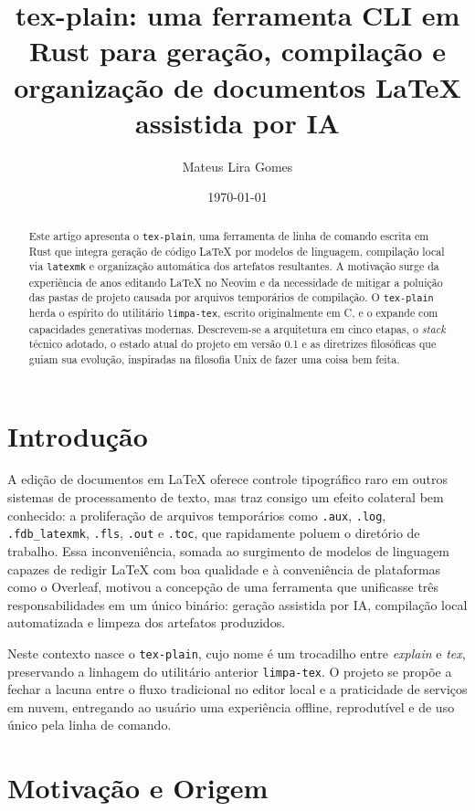 \documentclass[11pt,a4paper]{article}
\title{tex-plain: uma ferramenta CLI em Rust para geração, compilação e organização de documentos LaTeX assistida por IA}
\author{Mateus Lira Gomes}
\date{\today}
\begin{document}
\maketitle

\begin{abstract}
Este artigo apresenta o \texttt{tex-plain}, uma ferramenta de linha de comando escrita em Rust que integra geração de código LaTeX por modelos de linguagem, compilação local via \texttt{latexmk} e organização automática dos artefatos resultantes. A motivação surge da experiência de anos editando LaTeX no Neovim e da necessidade de mitigar a poluição das pastas de projeto causada por arquivos temporários de compilação. O \texttt{tex-plain} herda o espírito do utilitário \texttt{limpa-tex}, escrito originalmente em C, e o expande com capacidades generativas modernas. Descrevem-se a arquitetura em cinco etapas, o \textit{stack} técnico adotado, o estado atual do projeto em versão 0.1 e as diretrizes filosóficas que guiam sua evolução, inspiradas na filosofia Unix de fazer uma coisa bem feita.
\end{abstract}

\section{Introdução}

A edição de documentos em LaTeX oferece controle tipográfico raro em outros sistemas de processamento de texto, mas traz consigo um efeito colateral bem conhecido: a proliferação de arquivos temporários como \texttt{.aux}, \texttt{.log}, \texttt{.fdb\_latexmk}, \texttt{.fls}, \texttt{.out} e \texttt{.toc}, que rapidamente poluem o diretório de trabalho. Essa inconveniência, somada ao surgimento de modelos de linguagem capazes de redigir LaTeX com boa qualidade e à conveniência de plataformas como o Overleaf, motivou a concepção de uma ferramenta que unificasse três responsabilidades em um único binário: geração assistida por IA, compilação local automatizada e limpeza dos artefatos produzidos.

Neste contexto nasce o \texttt{tex-plain}, cujo nome é um trocadilho entre \textit{explain} e \textit{tex}, preservando a linhagem do utilitário anterior \texttt{limpa-tex}. O projeto se propõe a fechar a lacuna entre o fluxo tradicional no editor local e a praticidade de serviços em nuvem, entregando ao usuário uma experiência offline, reprodutível e de uso único pela linha de comando.

\section{Motivação e Origem}
\end{document}
